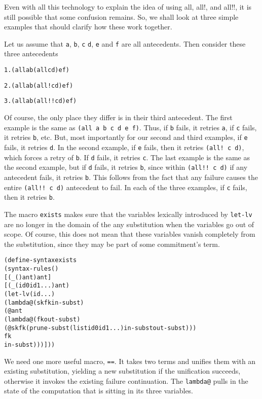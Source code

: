 Even with all this technology to explain the idea of using all, all!,
and all!!, it is still possible that some confusion remains.  So, we
shall look at three simple examples that should clarify how these
work together.

Let us assume that \texttt{a}, \texttt{b}, \texttt{c} \texttt{d},
\texttt{e} and \texttt{f} are all antecedents.  Then consider these
three antecedents

\begin{alltt}
1. (all a b (all c d) e f)

2. (all a b (all! c d) e f)

3. (all a b (all!! c d) e f)
\end{alltt}

Of course, the only place they differ is in their third antecedent.
The first example is the same as \texttt{(all a b c d e f)}.  Thus, if
\texttt{b} fails, it retries \texttt{a}, if \texttt{c} fails, it
retries \texttt{b}, etc. But, most importantly for our second and
third examples, if \texttt{e} fails, it retries \texttt{d}.  In the
second example, if \texttt{e} fails, then it retries \texttt{(all! c
d)}, which forces a retry of \texttt{b}.  If \texttt{d} fails, it
retries \texttt{c}.  The last example is the same as the second
example, but if \texttt{d} fails, it retries \texttt{b}, since within
\texttt{(all!! c d)} if any antecedent fails, it retries \texttt{b}.
This follows from the fact that any failure causes the entire
\texttt{(all!! c d)} antecedent to fail.  In each of the three
examples, if \texttt{c} fails, then it retries \texttt{b}.

The macro \texttt{exists} makes sure that the variables
lexically introduced by \texttt{let-lv} are no longer in the
domain of the any substitution when the variables go out of scope.
Of course, this does not mean that these variables vanish completely
from the substitution, since they may be part of some commitment's term.

\begin{alltt}
(define-syntax exists
  (syntax-rules ()
    [(_ () ant) ant]
    [(_ (id0 id1 ...) ant)
     (let-lv (id ...)
       (lambda@ (sk fk in-subst)
	 (@ ant
            (lambda@ (fk out-subst)
              (@ sk fk (prune-subst (list id0 id1 ...) in-subst out-subst)))
            fk
            in-subst)))]))
\end{alltt}

We need one more useful macro, \texttt{==}.  It takes two terms and
unifies them with an existing substitution, yielding a new
substitution if the unification succeeds, otherwise it invokes the
existing failure continuation.  The \texttt{lambda@} pulls in the
state of the computation that is sitting in its three variables.

